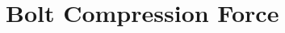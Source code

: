 \documentclass[../main.tex]{subfiles}
\begin{document}
\section{Bolt Compression Force} \label{compressive}
\end{document}
